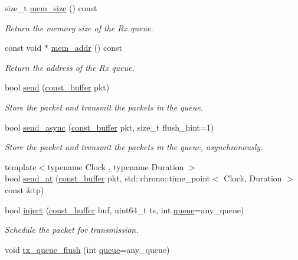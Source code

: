 \begin{DoxyCompactItemize}
size\+\_\+t \hyperlink{classpfq_1_1socket_a1888ae33a42258fdbb2aac1dc3feb55c}{mem\+\_\+size} () const 
\begin{DoxyCompactList}\small\item\em Return the memory size of the Rx queue. \end{DoxyCompactList}\item 
const void $\ast$ \hyperlink{classpfq_1_1socket_a32275b5b77913fadc7671efdef75369b}{mem\+\_\+addr} () const 
\begin{DoxyCompactList}\small\item\em Return the address of the Rx queue. \end{DoxyCompactList}\item 
bool \hyperlink{classpfq_1_1socket_ab0b61a0a5741e24aa7cfbf090e2dc776}{send} (\hyperlink{namespacepfq_ac835a1bd09b4cbaba61c100b50d0a99f}{const\+\_\+buffer} pkt)
\begin{DoxyCompactList}\small\item\em Store the packet and transmit the packets in the queue. \end{DoxyCompactList}\item 
bool \hyperlink{classpfq_1_1socket_aa3429cc82396d2bd30a55876c6fff8ba}{send\+\_\+async} (\hyperlink{namespacepfq_ac835a1bd09b4cbaba61c100b50d0a99f}{const\+\_\+buffer} pkt, size\+\_\+t flush\+\_\+hint=1)
\begin{DoxyCompactList}\small\item\em Store the packet and transmit the packets in the queue, asynchronously. \end{DoxyCompactList}\item 
{\footnotesize template$<$typename Clock , typename Duration $>$ }\\bool \hyperlink{classpfq_1_1socket_a0898dc7fd64a260c2e4104bff0314020}{send\+\_\+at} (\hyperlink{namespacepfq_ac835a1bd09b4cbaba61c100b50d0a99f}{const\+\_\+buffer} pkt, std\+::chrono\+::time\+\_\+point$<$ Clock, Duration $>$ const \&tp)
\item 
bool \hyperlink{classpfq_1_1socket_a66ce6d24cf127796ba26fe3112b82f44}{inject} (\hyperlink{namespacepfq_ac835a1bd09b4cbaba61c100b50d0a99f}{const\+\_\+buffer} buf, uint64\+\_\+t ts, int \hyperlink{classpfq_1_1queue}{queue}=any\+\_\+queue)
\begin{DoxyCompactList}\small\item\em Schedule the packet for transmission. \end{DoxyCompactList}\item 
void \hyperlink{classpfq_1_1socket_a88e4764d8e7fc86b6e3ea1fbff407a96}{tx\+\_\+queue\+\_\+flush} (int \hyperlink{classpfq_1_1queue}{queue}=any\+\_\+queue)

\end{DoxyCompactItemize}
